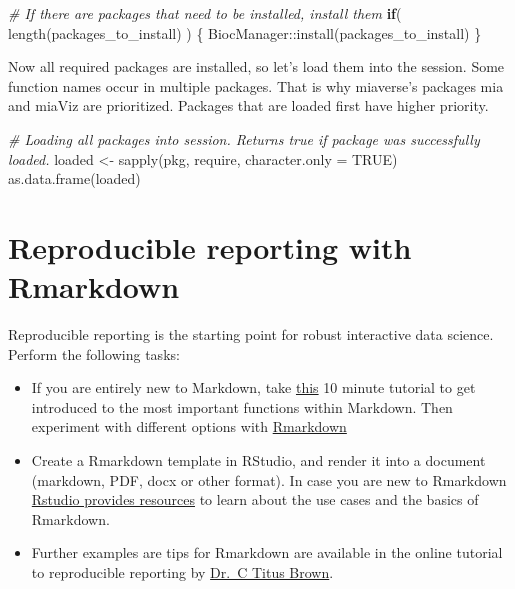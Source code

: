 \documentclass[
  oneside]{book}
\newenvironment{Shaded}{\begin{snugshade}}{\end{snugshade}}
\newcommand{\AttributeTok}[1]{\textcolor[rgb]{0.77,0.63,0.00}{#1}}
\newcommand{\CommentTok}[1]{\textcolor[rgb]{0.56,0.35,0.01}{\textit{#1}}}
\newcommand{\ConstantTok}[1]{\textcolor[rgb]{0.00,0.00,0.00}{#1}}
\newcommand{\ControlFlowTok}[1]{\textcolor[rgb]{0.13,0.29,0.53}{\textbf{#1}}}
\newcommand{\FunctionTok}[1]{\textcolor[rgb]{0.00,0.00,0.00}{#1}}
\newcommand{\NormalTok}[1]{#1}
\newcommand{\OtherTok}[1]{\textcolor[rgb]{0.56,0.35,0.01}{#1}}
\newcommand{\SpecialCharTok}[1]{\textcolor[rgb]{0.00,0.00,0.00}{#1}}
\begin{document}
\begin{Shaded}
\begin{Highlighting}[]
\CommentTok{\# If there are packages that need to be installed, install them }
\ControlFlowTok{if}\NormalTok{( }\FunctionTok{length}\NormalTok{(packages\_to\_install) ) \{}
\NormalTok{   BiocManager}\SpecialCharTok{::}\FunctionTok{install}\NormalTok{(packages\_to\_install)}
\NormalTok{\}}
\end{Highlighting}
\end{Shaded}

Now all required packages are installed, so let's load them into the session.
Some function names occur in multiple packages. That is why miaverse's packages
mia and miaViz are prioritized. Packages that are loaded first have higher priority.

\begin{Shaded}
\begin{Highlighting}[]
\CommentTok{\# Loading all packages into session. Returns true if package was successfully loaded.}
\NormalTok{loaded }\OtherTok{\textless{}{-}} \FunctionTok{sapply}\NormalTok{(pkg, require, }\AttributeTok{character.only =} \ConstantTok{TRUE}\NormalTok{)}
\FunctionTok{as.data.frame}\NormalTok{(loaded)}
\end{Highlighting}
\end{Shaded}

\hypertarget{reproducible-reporting-with-rmarkdown}{%
\chapter{Reproducible reporting with Rmarkdown}\label{reproducible-reporting-with-rmarkdown}}

Reproducible reporting is the starting point for robust interactive
data science. Perform the following tasks:

\begin{itemize}
\item
  If you are entirely new to Markdown, take
  \href{https://www.markdowntutorial.com/}{this} 10 minute tutorial to get
  introduced to the most important functions within Markdown. Then
  experiment with different options with
  \href{https://www.rstudio.com/wp-content/uploads/2015/02/rmarkdown-cheatsheet.pdf}{Rmarkdown}
\item
  Create a Rmarkdown template in RStudio, and render it into a
  document (markdown, PDF, docx or other format). In case you are new
  to Rmarkdown \href{https://rmarkdown.rstudio.com/lesson-1.html}{Rstudio provides
  resources} to learn
  about the use cases and the basics of Rmarkdown.
\item
  Further examples are tips for Rmarkdown are available in the
  online tutorial to reproducible reporting by \href{https://rpubs.com/marschmi/RMarkdown}{Dr.~C Titus
  Brown}.
\end{itemize}
\end{document}
